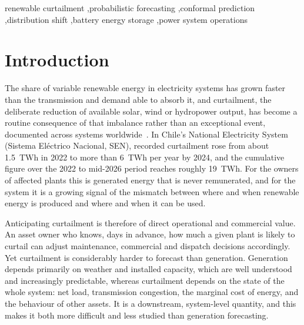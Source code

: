 \documentclass[preprint,3p,times]{elsarticle}
\begin{document}
\begin{frontmatter}
\begin{keyword}
renewable curtailment \sep probabilistic forecasting \sep conformal prediction \sep distribution shift \sep battery energy storage \sep power system operations
\end{keyword}

\end{frontmatter}

\section{Introduction}
\label{sec:intro}

The share of variable renewable energy in electricity systems has grown faster than the transmission and demand able to absorb it, and curtailment, the deliberate reduction of available solar, wind or hydropower output, has become a routine consequence of that imbalance rather than an exceptional event, documented across systems worldwide~\cite{oshaughnessy2020}. In Chile's National Electricity System (Sistema El\'ectrico Nacional, SEN), recorded curtailment rose from about 1.5~TWh in 2022 to more than 6~TWh per year by 2024, and the cumulative figure over the 2022 to mid-2026 period reaches roughly 19~TWh. For the owners of affected plants this is generated energy that is never remunerated, and for the system it is a growing signal of the mismatch between where and when renewable energy is produced and where and when it can be used.

Anticipating curtailment is therefore of direct operational and commercial value. An asset owner who knows, days in advance, how much a given plant is likely to curtail can adjust maintenance, commercial and dispatch decisions accordingly. Yet curtailment is considerably harder to forecast than generation. Generation depends primarily on weather and installed capacity, which are well understood and increasingly predictable, whereas curtailment depends on the state of the whole system: net load, transmission congestion, the marginal cost of energy, and the behaviour of other assets. It is a downstream, system-level quantity, and this makes it both more difficult and less studied than generation forecasting.
\end{document}
